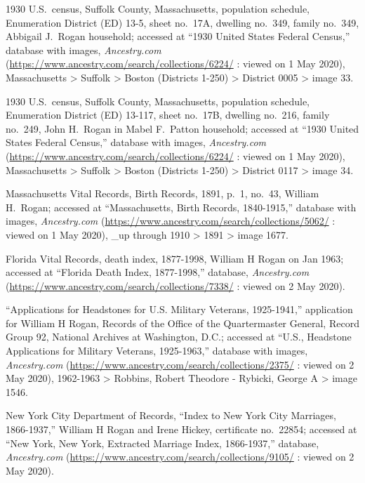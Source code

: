 \begin{thebibliography}{999}
1930 U.S.\ census, Suffolk County, Massachusetts, population schedule, Enumeration District (ED) 13-5, sheet no.\ 17A, dwelling no.\ 349, family no.\ 349, Abbigail J.\ Rogan household; accessed at ``1930 United States Federal Census,'' database with images, \textit{Ancestry.com} (\url{https://www.ancestry.com/search/collections/6224/} : viewed on 1 May 2020), Massachusetts > Suffolk > Boston (Districts 1-250) > District 0005 > image 33.

1930 U.S.\ census, Suffolk County, Massachusetts, population schedule, Enumeration District (ED) 13-117, sheet no.\ 17B, dwelling no.\ 216, family no.\ 249, John H.\ Rogan in Mabel F.\ Patton household; accessed at ``1930 United States Federal Census,'' database with images, \textit{Ancestry.com} (\url{https://www.ancestry.com/search/collections/6224/} : viewed on 1 May 2020), Massachusetts > Suffolk > Boston (Districts 1-250) > District 0117 > image 34.

Massachusetts Vital Records, Birth Records, 1891, p.\ 1, no.\ 43, William H.\ Rogan; accessed at ``Massachusetts, Birth Records, 1840-1915,'' database with images, \textit{Ancestry.com} (\url{https://www.ancestry.com/search/collections/5062/} : viewed on 1 May 2020), \_up through 1910 > 1891 > image 1677.

Florida Vital Records, death index, 1877-1998, William H Rogan on Jan 1963; accessed at ``Florida Death Index, 1877-1998,'' database, \textit{Ancestry.com} (\url{https://www.ancestry.com/search/collections/7338/} : viewed on 2 May 2020).

``Applications for Headstones for U.S. Military Veterans, 1925-1941,'' application for William H Rogan, Records of the Office of the Quartermaster General, Record Group 92, National Archives at Washington, D.C.; accessed at ``U.S., Headstone Applications for Military Veterans, 1925-1963,'' database with images, \textit{Ancestry.com} (\url{https://www.ancestry.com/search/collections/2375/} : viewed on 2 May 2020), 1962-1963 > Robbins, Robert Theodore - Rybicki, George A > image 1546.

New York City Department of Records, ``Index to New York City Marriages, 1866-1937,'' William H Rogan and Irene Hickey, certificate no.\ 22854; accessed at ``New York, New York, Extracted Marriage Index, 1866-1937,'' database, \textit{Ancestry.com} (\url{https://www.ancestry.com/search/collections/9105/} : viewed on 2 May 2020).


\end{thebibliography}
